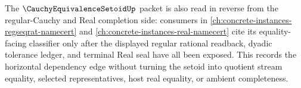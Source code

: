 The $\CauchyEquivalenceSetoidUp$ packet is also read in reverse from the regular-Cauchy and Real completion side: consumers in \autoref{ch:concrete-instances-regseqrat-namecert} and \autoref{ch:concrete-instances-real-namecert} cite its equality-facing classifier only after the displayed regular rational readback, dyadic tolerance ledger, and terminal Real seal have all been exposed. This records the horizontal dependency edge without turning the setoid into quotient stream equality, selected representatives, host real equality, or ambient completeness.
